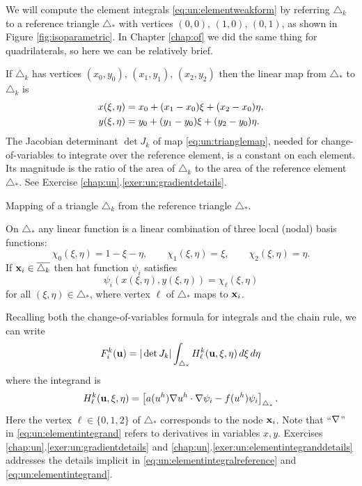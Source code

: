 We will compute the element integrals \eqref{eq:un:elementweakform} by referring $\triangle_k$ to a reference triangle $\triangle_\ast$ with vertices $(0,0),\,(1,0),\,(0,1)$, as shown in Figure \ref{fig:isoparametric}.  In Chapter \ref{chap:of} we did the same thing for quadrilaterals, so here we can be relatively brief.

If $\triangle_k$ has vertices $(x_0,y_0),\,(x_1,y_1),\,(x_2,y_2)$ then the linear map from $\triangle_\ast$ to $\triangle_k$ is
\begin{align}
x(\xi,\eta) &= x_0 + (x_1-x_0) \xi + (x_2-x_0) \eta, \label{eq:un:trianglemap} \\
y(\xi,\eta) &= y_0 + (y_1-y_0) \xi + (y_2-y_0) \eta. \notag
\end{align}
The Jacobian determinant $\det J_k$ of map \eqref{eq:un:trianglemap}, needed for change-of-variables to integrate over the reference element, is a constant on each element.  Its magnitude is the ratio of the area of $\triangle_k$ to the area of the reference element $\triangle_\ast$.  See Exercise \ref{chap:un}.\ref{exer:un:gradientdetails}.

\begin{marginfigure}

\caption{Mapping of a triangle $\triangle_k$ from the reference triangle $\triangle_\ast$.}
\label{fig:isoparametric}
\end{marginfigure}

On $\triangle_\ast$ any linear function is a linear combination of three local (nodal) basis functions:
\begin{equation}
\chi_0(\xi,\eta) = 1-\xi-\eta, \qquad \chi_1(\xi,\eta) = \xi, \qquad \chi_2(\xi,\eta) = \eta. \label{eq:un:chiformulas}
\end{equation}
If $\mathbf{x}_i\in\overline{\triangle_k}$ then hat function $\psi_i$ satisfies
\begin{equation}
\psi_i(x(\xi,\eta),y(\xi,\eta)) = \chi_\ell(\xi,\eta) \label{eq:un:psichimap}
\end{equation}
for all $(\xi,\eta)\in\triangle_\ast$, where vertex $\ell$ of $\triangle_\ast$ maps to $\mathbf{x}_i$.

Recalling both the change-of-variables formula for integrals and the chain rule, we can write
\begin{equation}
F_i^k(\mathbf{u}) = |\det J_k| \int_{\triangle_\ast} H_\ell^k(\mathbf{u},\xi,\eta)\,d\xi\,d\eta \label{eq:un:elementintegralreference}
\end{equation}
where the integrand is
\begin{equation}
H_\ell^k(\mathbf{u},\xi,\eta) = \left[a(u^h) \nabla u^h \cdot \nabla \psi_i - f(u^h) \psi_i\right]_{\triangle_\ast}.  \label{eq:un:elementintegrand}
\end{equation}
Here the vertex $\ell \in \{0,1,2\}$ of $\triangle_\ast$ corresponds to the node $\mathbf{x}_i$.  Note that ``$\nabla$'' in \eqref{eq:un:elementintegrand} refers to derivatives in variables $x,y$.  Exercises \ref{chap:un}.\ref{exer:un:gradientdetails} and \ref{chap:un}.\ref{exer:un:elementintegranddetails} addresses the details implicit in \eqref{eq:un:elementintegralreference} and \eqref{eq:un:elementintegrand}.

